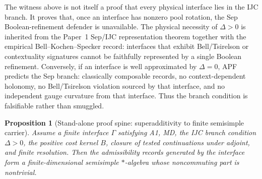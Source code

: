 \documentclass[11pt]{article}
\newtheorem{proposition}[theorem]{Proposition}
\theoremstyle{definition}
\begin{document}
\begin{tcolorbox}[apfbox, title={$\Delta=0$ falsifiability branch}]
\footnotesize
The witness above is not itself a proof that every physical interface lies
in the IJC branch.  It proves that, once an interface has nonzero pool
rotation, the Sep Boolean-refinement defender is unavailable.  The physical
necessity of $\Delta>0$ is inherited from the Paper~1 Sep/IJC representation
theorem together with the empirical Bell--Kochen--Specker record: interfaces
that exhibit Bell/Tsirelson or contextuality signatures cannot be faithfully
represented by a single Boolean refinement.  Conversely, if an interface is
well approximated by $\Delta=0$, APF predicts the Sep branch: classically
composable records, no context-dependent holonomy, no Bell/Tsirelson
violation sourced by that interface, and no independent gauge curvature
from that interface.  Thus the branch condition is falsifiable rather than
smuggled.
\end{tcolorbox}

\begin{proposition}[Stand-alone proof spine: superadditivity to finite semisimple carrier]
\label{prop:superadd_to_semisimple_v35}
Assume a finite interface $\Gamma$ satisfying A1, MD, the IJC branch condition $\Delta>0$, the positive cost kernel $B$, closure of tested continuations under adjoint, and finite resolution.  Then the admissibility records generated by the interface form a finite-dimensional semisimple $*$-algebra whose noncommuting part is nontrivial.
\end{proposition}
\end{document}
